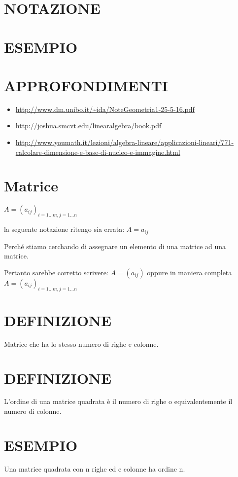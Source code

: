 \section{NOTAZIONE}

\section{ESEMPIO}

\section{APPROFONDIMENTI}
\begin{itemize}
 \item \url{http://www.dm.unibo.it/~ida/NoteGeometria1-25-5-16.pdf}
 \item \url{http://joshua.smcvt.edu/linearalgebra/book.pdf}
 \item \url{http://www.youmath.it/lezioni/algebra-lineare/applicazioni-lineari/771-calcolare-dimensione-e-base-di-nucleo-e-immagine.html}
\end{itemize}


\section{Matrice}
$A = (a_{ij})_{i=1...m,j=1...n}$

la seguente notazione ritengo sia errata:
$A = a_{ij}$

Perch\'{e} stiamo cerchando di assegnare un elemento di una matrice ad una matrice.

Pertanto sarebbe corretto scrivere: $A = (a_{ij})$ oppure in maniera completa $A = (a_{ij})_{i=1...m,j=1...n}$


\section{DEFINIZIONE}
Matrice che ha lo stesso numero di righe e colonne.



\section{DEFINIZIONE}
L'ordine di una matrice quadrata è il numero di righe o equivalentemente il numero di colonne.

\section{ESEMPIO}
Una matrice quadrata con n righe ed e colonne ha ordine n.



